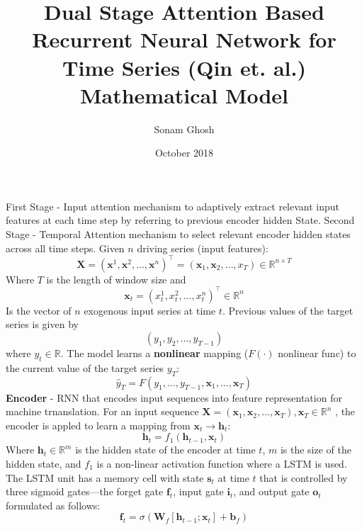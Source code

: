 \documentclass{article}
\title{Dual Stage Attention Based Recurrent Neural Network for Time Series (Qin et. al.) Mathematical Model}
\author{Sonam Ghosh}
\date{October 2018}
\begin{document}
\maketitle
\noindent First Stage - Input attention mechanism to adaptively extract relevant input features at each time step by referring to previous encoder hidden State. \newline
Second Stage - Temporal Attention mechanism to select relevant encoder hidden states across all time steps. \newline
Given $n$ driving series (input features):
$$ \textbf{X} = (\textbf{x}^{1}, \textbf{x}^{2}, \hdots, \textbf{x}^{n})^{\intercal} = (\textbf{x}_{1}, \textbf{x}_{2}, \hdots, x_{T}) \in \mathbb{R}^{n \times T}$$
Where $T$ is the length of window size and 
$$ \textbf{x}_{t} = (x_{t}^{1}, x_{t}^{2}, \hdots, x_{t}^{n})^{\intercal} \in \mathbb{R}^{n}$$
Is the vector of $n$ exogenous input series at time $t$. 
Previous values of the target series is given by
$$ (y_{1}, y_{2}, \hdots, y_{T-1}) $$
where $y_{t} \in \mathbb{R}$. \newline
The model learns a \textbf{nonlinear} mapping ($F(\cdot)$ nonlinear func) to the current value of the target series $y_{T}$:
\begin{equation}
    \hat{y}_{T} = F(y_{1}, \hdots, y_{T-1}, \textbf{x}_{1}, \hdots, \textbf{x}_{T})
\end{equation}
\textbf{Encoder} - RNN that encodes input sequences into feature representation for machine trnanslation. \newline
For an input sequence $\textbf{X} = (\textbf{x}_{1}, \textbf{x}_{2}, \hdots, \textbf{x}_{T}), \textbf{x}_{T} \in \mathbb{R}^{n}$ , the encoder is appled to learn a mapping from $\textbf{x}_{t} \rightarrow \textbf{h}_{t}$:
\begin{equation}
    \textbf{h}_{t} = f_{1}(\textbf{h}_{t-1}, \textbf{x}_{t})
\end{equation}
Where $\textbf{h}_{t} \in \mathbb{R}^{m}$ is the hidden state of the encoder at time $t$, $m$ is the size of the hidden state, and $f_{1}$ is a non-linear activation function where a LSTM is used. \newpage
\noindent The LSTM unit has a memory cell with state $\textbf{s}_{t}$ at time $t$ that is controlled by three sigmoid gates---the forget gate $\textbf{f}_{t}$, input gate $\textbf{i}_{t}$, and output gate $\textbf{o}_{t}$ formulated as follows:
\begin{equation}
    \textbf{f}_{t} = \sigma(\textbf{W}_{f}[\textbf{h}_{t-1};\textbf{x}_{t}] + \textbf{b}_{f})
\end{equation}
\end{document}
